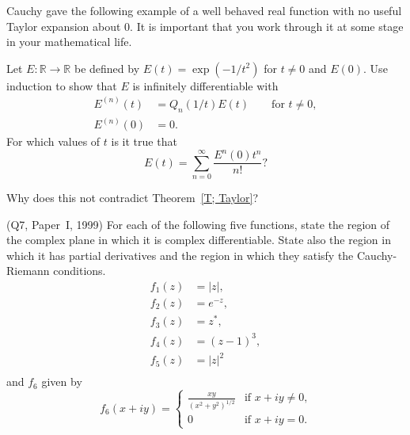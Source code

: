 \begin{question}\label{Exercise, no Taylor}
Cauchy gave the following example of a well behaved
real function with no useful Taylor expansion 
about $0$. It is important that you work through it
at some stage in your mathematical life.

Let $E:{\mathbb R}\rightarrow{\mathbb R}$ be defined
by $E(t)=\exp(-1/t^{2})$ for $t\neq 0$ and $E(0)$.
Use induction to show that $E$ is infinitely differentiable
with
\begin{align*}
E^{(n)}(t)&=Q_{n}(1/t)E(t)\qquad\text{for $t\neq 0$},\\
E^{(n)}(0)&=0.
\end{align*}
For which values of $t$ is it true that
\[E(t)=\sum_{n=0}^{\infty}\frac{E^{n}(0)t^{n}}{n!}?\] 

Why does this not contradict Theorem~\ref{T; Taylor}?
\end{question}
\begin{question} (Q7, Paper~I, 1999) For each of the following
five functions, state the region of the complex plane
in which it is complex differentiable. State also the region in which
it has partial derivatives and the region in which
they satisfy the Cauchy-Riemann conditions.
\begin{align*}
f_{1}(z)&=|z|,\\
f_{2}(z)&=e^{-z},\\
f_{3}(z)&=z^{*},\\
f_{4}(z)&=(z-1)^{3},\\
f_{5}(z)&=|z|^{2}\\
\end{align*}
and $f_{6}$ given by
\begin{equation*}
f_{6}(x+iy)=
\begin{cases}
\frac{xy}{(x^{2}+y^{2})^{1/2}}& \text{if $x+iy\neq0$,}\\
0& \text{if $x+iy=0$.}
\end{cases}
\end{equation*}
\end{question}
